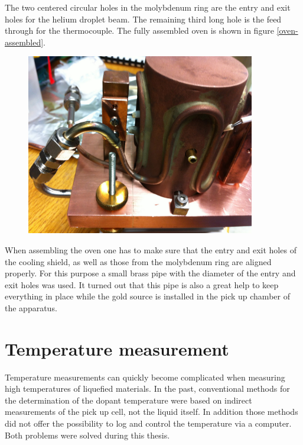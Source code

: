 \documentclass[parskip,12pt,headsepline,a4paper] {scrbook}
\begin{document}
The two centered circular holes in the molybdenum ring are the entry and exit holes for the helium droplet beam. The remaining third long hole is the feed through for the thermocouple. The fully assembled oven is shown in figure \ref{oven-assembled}.

\begin{figure}[ht]
\centerline{
\includegraphics[width=10cm]{./oven/FullyAssembled.jpg}}
\end{figure}


When assembling the oven one has to make sure that the entry and exit holes of the cooling shield, as well as those from the molybdenum ring are aligned properly. For this purpose a small brass pipe with the diameter of the entry and exit holes was used. It turned out that this pipe is also a great help to keep everything in place while the gold source is installed in the pick up chamber of the apparatus.

\section{Temperature measurement}
\vspace{-1\baselineskip}
Temperature measurements can quickly become complicated when measuring high temperatures of liquefied materials. In the past, conventional methods for the determination of the dopant temperature were based on indirect measurements of the pick up cell, not the liquid itself. In addition those methods did not offer the possibility to log and control the temperature via a computer. Both problems were solved during this thesis. \\
\end{document}
